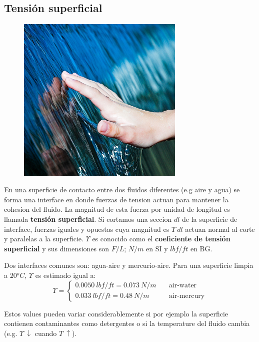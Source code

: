 \documentclass[10pt, oneside]{article}
\begin{document}
\subsection{Tensi\'on superficial}

\begin{figure}[h]
\centering
\includegraphics[width=8cm]{SurfaceTension}
\end{figure}


En una superficie de contacto entre dos fluidos diferentes (e.g aire y agua) se forma una interface en donde fuerzas de tension actuan para mantener la cohesion del fluido. La magnitud de esta fuerza por unidad de longitud es llamada \textbf{tensi\'on superficial}. Si cortamos una seccion $dl$ de la superficie de interface, fuerzas iguales y opuestas cuya magnitud es $\Upsilon\ dl$ actuan normal al corte y paralelas a la superficie. $\Upsilon$ es conocido como el \textbf{coeficiente de tensi\'on superficial} y sus dimensiones  son ${F/L}$; $N/m$ en SI y $lbf/ft$ en BG.

Dos interfaces comunes son: agua-aire y mercurio-aire. Para una superficie limpia a 20$^oC$, $\Upsilon$ es estimado igual a:
\begin{equation}
\Upsilon =
\begin{cases}
0.0050\ lbf/ft = 0.073\ N/m & \quad \text{air-water} \\
0.033\ lbf/ft = 0.48\ N/m& \quad \text{air-mercury} 
\end{cases}
\end{equation}

Estos values pueden variar considerablemente si por ejemplo la superficie contienen contaminantes como detergentes o si la temperature del fluido cambia (e.g. $\Upsilon\ \downarrow$ cuando $T\ \uparrow$).
\end{document}
